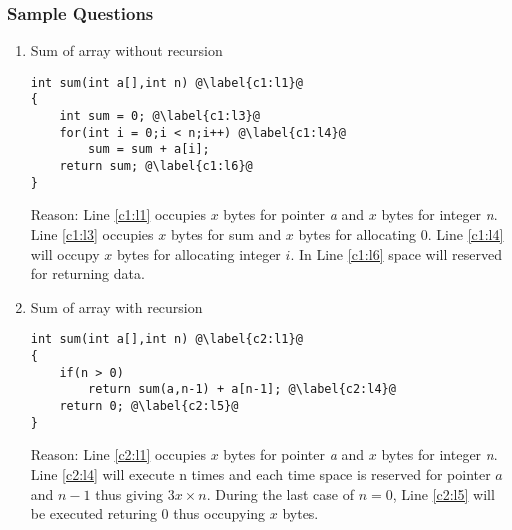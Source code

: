 \documentclass[./AlgorithmDesign.tex]{subfiles}
\begin{document}
\subsubsection*{Sample Questions}
\begin{enumerate}
\item Sum of array without recursion
\begin{mdframed}
\begin{lstlisting}[label=c1]
int sum(int a[],int n) @\label{c1:l1}@
{
    int sum = 0; @\label{c1:l3}@
    for(int i = 0;i < n;i++) @\label{c1:l4}@
        sum = sum + a[i]; 
    return sum; @\label{c1:l6}@
}
\end{lstlisting}

\vspace{3mm}

Reason: 
Line \ref{c1:l1} occupies $x$ bytes for pointer \textit{a} and $x$ bytes for integer \textit{n}. 
Line \ref{c1:l3} occupies $x$ bytes for sum and $x$ bytes for allocating 0. 
Line \ref{c1:l4} will occupy $x$ bytes for allocating integer $i$.
In Line \ref{c1:l6} space will reserved for returning data.
\end{mdframed}

\item Sum of array with recursion
\begin{mdframed}
\begin{lstlisting}[label=c2]
int sum(int a[],int n) @\label{c2:l1}@
{
    if(n > 0)
        return sum(a,n-1) + a[n-1]; @\label{c2:l4}@
    return 0; @\label{c2:l5}@
}
\end{lstlisting}

\vspace{3mm}

Reason: 
Line \ref{c2:l1} occupies $x$ bytes for pointer \textit{a} and $x$ bytes for integer \textit{n}. 
Line \ref{c2:l4} will execute n times and each time space is reserved for pointer $a$ and $n-1$ thus giving $3x\times n$. 
During the last case of $n = 0$, Line \ref{c2:l5} will be executed returing 0 thus occupying $x$ bytes.

\end{mdframed}
\end{enumerate}
\end{document}
